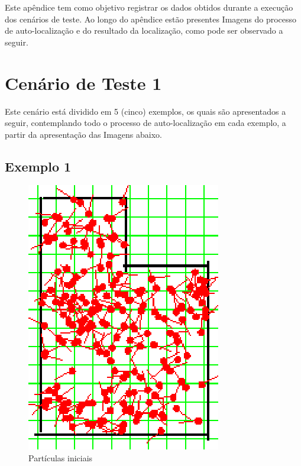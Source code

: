 
Este apêndice tem como objetivo registrar os dados obtidos durante a execução dos cenários de teste. Ao longo do apêndice estão presentes
Imagens do processo de auto-localização e do resultado da localização, como pode ser observado a seguir.

\section{Cenário de Teste 1}

Este cenário está dividido em 5 (cinco) exemplos, os quais são apresentados a seguir, contemplando todo o processo de auto-localização
em cada exemplo, a partir da apresentação das Imagens abaixo.

\subsection{Exemplo 1}

\begin{figure}[H]
  \centering
  \includegraphics[scale=0.6]{figuras/cen1_ex1/1.eps}
  \caption[Partículas Iniciais]{Partículas iniciais}
  \label{img:cen1_ex1_1}
\end{figure}

